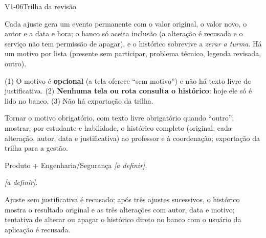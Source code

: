 \begin{resposta}{V1-06}{Trilha da revisão}{\parcial}
\begin{campos}
  \item[Existe] Cada ajuste gera um evento permanente com o valor original,
    o valor novo, o autor e a data e hora; o banco só aceita inclusão (a
    alteração é recusada e o serviço não tem permissão de apagar), e o
    histórico sobrevive a \emph{zerar a turma}. Há um motivo por lista
    (presente sem participar, problema técnico, legenda revisada, outro).
  \item[Diferença] (1) O motivo é \textbf{opcional} (a tela oferece ``sem
    motivo'') e não há texto livre de justificativa. (2) \textbf{Nenhuma tela
    ou rota consulta o histórico}: hoje ele só é lido no banco. (3) Não há
    exportação da trilha.
  \item[Proposta] Tornar o motivo obrigatório, com texto livre obrigatório
    quando ``outro''; mostrar, por estudante e habilidade, o histórico
    completo (original, cada alteração, autor, data e justificativa) ao
    professor e à coordenação; exportação da trilha para a gestão.
  \item[Responsável] Produto + Engenharia/Segurança \textit{[a definir]}.
  \item[Homologação] \textit{[a definir]}.
  \item[Aceite] Ajuste sem justificativa é recusado; após três ajustes
    sucessivos, o histórico mostra o resultado original e as três alterações
    com autor, data e motivo; tentativa de alterar ou apagar o histórico
    direto no banco com o usuário da aplicação é recusada.
\end{campos}
\end{resposta}
